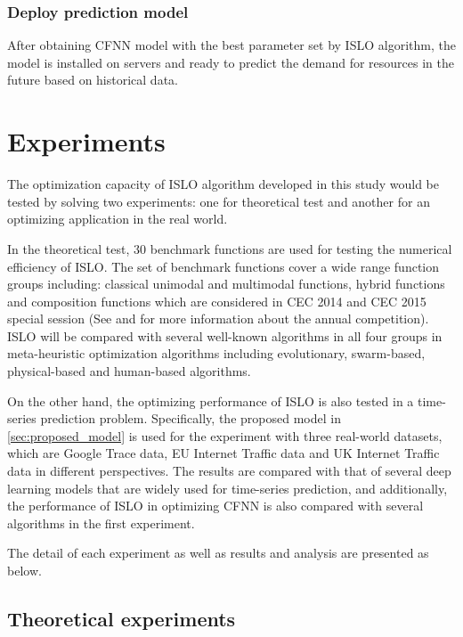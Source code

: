 \documentclass[a4paper,13pt,2p]{report}
\begin{document}
\subsection{Deploy prediction model}
\label{deploy}
	
	After obtaining CFNN model with the best parameter set by ISLO algorithm, the model is installed on servers and ready to predict the demand for resources in the future based on historical data.   
	  
\chapter{Experiments}
\label{ch:experiments}
The optimization capacity of ISLO algorithm developed in this study would be tested by solving two experiments: one for theoretical test and another for an optimizing application in the real world.
 
	In the theoretical test, 30 benchmark functions are used for testing the numerical efficiency of ISLO. The set of benchmark functions cover a wide range function groups including: classical unimodal and multimodal functions, hybrid functions and composition functions which are considered in CEC 2014 and CEC 2015 special session (See \cite{liang2013problem} and \cite{liang2014problem} for more information about the annual competition). ISLO will be compared with several well-known algorithms in all four groups in meta-heuristic optimization algorithms including evolutionary, swarm-based, physical-based and human-based algorithms.
	
	On the other hand, the optimizing performance of ISLO is also tested in a time-series prediction problem. Specifically, the proposed model in \ref{sec:proposed_model} is used for the experiment with three real-world datasets, which are Google Trace data, EU Internet Traffic data and UK Internet Traffic data in different perspectives. The results are compared with that of several deep learning models that are widely used for time-series prediction, and additionally, the performance of ISLO in optimizing CFNN is also compared with several algorithms in the first experiment. 
	
	The detail of each experiment as well as results and analysis are presented as below.
	
\section{Theoretical experiments}
\label{sec:exp_theory}
\end{document}
